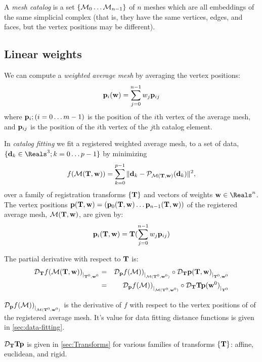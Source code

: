 \label{sec:Averaging}

A {\it mesh catalog} is a set $\{ {\mathcal M}_0 \ldots {\mathcal M}_{n-1} \}$
of $n$ meshes which are all embeddings
of the same simplicial complex
(that is, they have the same vertices, edges, and faces,
but the vertex positions may be different).

\subsection{Linear weights}
\label{sec:Linear-weights}

We can compute a {\it weighted average mesh} by averaging the vertex positions:
\begin{equation}
{\mathbf p}_i({\mathbf w}) = \sum_{j=0}^{n-1} w_j {\mathbf p}_{ij}
\end{equation}
where ${\mathbf p}_{i}; (i=0 \ldots m-1)$ is the position of the $i$th vertex of the average mesh,
and ${\mathbf p}_{ij}$ is the position of the $i$th vertex of the $j$th catalog element.

In {\it catalog fitting} we fit a registered weighted average mesh,
to a set of data, $\{ \d_k \in \Reals^3; k=0 \ldots p-1 \}$
by minimizing
\begin{equation}
f({\mathcal M}({\mathbf T},{\mathbf w})) = \sum_{k=0}^{p-1} \| {\mathbf d}_k - {\mathcal P}_{{\mathcal M}({\mathbf T},{\mathbf w})} ({\mathbf d}_k) \|^2 ,
\end{equation}
over a family of registration transforms $\{{\mathbf T}\}$
and vectors of weights $\w \in \Reals^n$.
The vertex positions ${\mathbf p}({\mathbf T},{\mathbf w}) = ({\mathbf p}_0({\mathbf T},{\mathbf w}) \ldots  {\mathbf p}_{n-1}({\mathbf T},{\mathbf w}))$
of the registered average mesh, ${\mathcal M}({\mathbf T},{\mathbf w})$, are given by:
\begin{equation}
{\mathbf p}_i({\mathbf T},{\mathbf w}) = {\mathbf T} ( \sum_{j=0}^{n-1} w_j {\mathbf p}_{ij} )
\end{equation}

The partial derivative with respect to ${\mathbf T}$
is:
\begin{eqnarray}
{\mathcal D}_{{\mathbf T}}{f({\mathcal M}({\mathbf T},{\mathbf w}))}_{\mid_{{\mathbf T}^0,{\mathbf w}^0}}
& = &
{\mathcal D}_{{\mathbf p}}{f({\mathcal M}))}_{\mid_{{\mathcal M}({\mathbf T}^0,{\mathbf w}^0)}}
\circ
{\mathcal D}_{{\mathbf T}}{{\mathbf p}({\mathbf T},{\mathbf w})}_{\mid_{{\mathbf T}^0,{\mathbf w}^0}}
\\
& = &
{\mathcal D}_{{\mathbf p}}{f({\mathcal M}))}_{\mid_{{\mathcal M}({\mathbf T}^0,{\mathbf w}^0)}}
\circ
{\mathcal D}_{{\mathbf T}}{{\mathbf T}{\mathbf p}({\mathbf w}^0)}_{\mid_{{\mathbf T}^0}}
\nonumber
\end{eqnarray}

${\mathcal D}_{{\mathbf p}}{f({\mathcal M}))}_{\mid_{{\mathcal M}({\mathbf T}^0,{\mathbf w}^0)}}$ is the derivative of $f$ with respect to
the vertex positions of of the registered average mesh.
It's value for data fitting distance functions
is given in \autoref{sec:data-fitting}.

${\mathcal D}_{{\mathbf T}}{{\mathbf T}{\mathbf p}}$ is given in \autoref{sec:Transforms}
for various families of transforms $\{{\mathbf T}\}$: affine, euclidean, and rigid.

